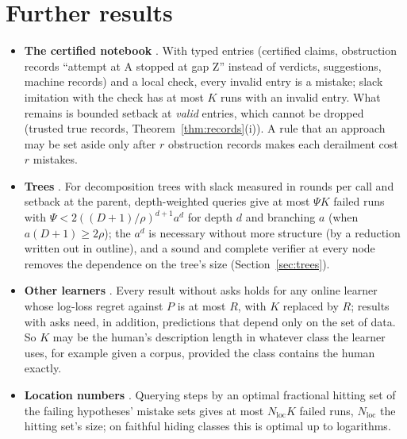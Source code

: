 \documentclass[11pt]{article}
\theoremstyle{definition}
\theoremstyle{remark}
\newcommand{\K}{K}
\begin{document}
\section{Further results}\label{app:more}
\begin{itemize}
\item \textbf{The certified notebook} \cite{threadF}. With typed entries (certified claims, obstruction records ``attempt at A stopped at gap Z'' instead of verdicts, suggestions, machine records) and a local check, every invalid entry is a mistake; slack imitation with the check has at most $\K$ runs with an invalid entry. What remains is bounded setback at \emph{valid} entries, which cannot be dropped (trusted true records, Theorem~\ref{thm:records}(i)). A rule that an approach may be set aside only after $r$ obstruction records makes each derailment cost $r$ mistakes.
\item \textbf{Trees} \cite{threadN}. For decomposition trees with slack measured in rounds per call and setback at the parent, depth-weighted queries give at most $\Psi\K$ failed runs with $\Psi<2((D+1)/\rho)^{d+1}a^d$ for depth $d$ and branching $a$ (when $a(D+1)\ge2\rho$); the $a^d$ is necessary without more structure (by a reduction written out in outline), and a sound and complete verifier at every node removes the dependence on the tree's size (Section~\ref{sec:trees}).
\item \textbf{Other learners} \cite{threadH}. Every result without asks holds for any online learner whose log-loss regret against $P$ is at most $R$, with $\K$ replaced by $R$; results with asks need, in addition, predictions that depend only on the set of data. So $\K$ may be the human's description length in whatever class the learner uses, for example given a corpus, provided the class contains the human exactly.
\item \textbf{Location numbers} \cite{threadJ}. Querying steps by an optimal fractional hitting set of the failing hypotheses' mistake sets gives at most $N_{\mathrm{loc}}\K$ failed runs, $N_{\mathrm{loc}}$ the hitting set's size; on faithful hiding classes this is optimal up to logarithms.
\end{itemize}
\end{document}

